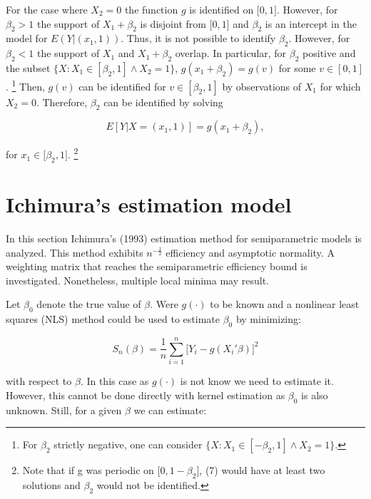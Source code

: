 \documentclass[a4paper]{article}
\begin{document}
For the case where $X_2 = 0$ the function $g$ is identified on $\big[0,1\big]$. However, for $\beta_2 > 1$ the support of $ X_1 + \beta_2$ is disjoint from $\big[0,1\big]$ and $\beta_2$ is an intercept in the model for $E(Y|(x_1,1))$. Thus, it is not possible to identify $\beta_2$. However, for $\beta_2 < 1$ the support of $X_1$ and $X_1 + \beta_2$ overlap. In particular, for $\beta_2$ positive and the subset $\{X: X_1 \in [\beta_2, 1] \wedge X_2 = 1\}$, $g(x_1 + \beta_2) = g(v)$ for some $v \in [0,1]$. \footnote{For $\beta_2$ strictly negative, one can consider $\{X: X_1 \in [ - \beta_2, 1] \wedge X_2 = 1\}$.} Then, $g(v)$ can be identified for $v \in [\beta_2, 1]$ by observations of $X_1$ for which $X_2 = 0$. Therefore, $\beta_2$ can be identified by solving

\begin{equation}
E[Y| X = (x_1,1)] = g(x_1 + \beta_2),
\end{equation}

for $x_1 \in \big[\beta_2, 1\big]$. \footnote{Note that if g was periodic on $\big[0, 1 - \beta_2 \big]$, (7) would have at least two solutions and $\beta_2$ would not be identified.}


\section{Ichimura's estimation model} %
\label{sec:Ichimura's estimation model}

In this section Ichimura's (1993) estimation method for semiparametric models is analyzed. This method exhibits $n^{-\frac{1}{2}}$ efficiency and asymptotic normality. A weighting matrix that reaches the semiparametric efficiency bound is investigated. Nonetheless, multiple local minima may result. 

Let $\beta_0$ denote the true value of $\beta$. Were $g(\cdot)$ to be known and a nonlinear least squares (NLS) method could be used to estimate $\beta_0$ by minimizing:

\begin{equation}
S_n(\beta) = \frac{1}{n}\sum_{i = 1}^n\big[Y_i - g(X_i'\beta)\big]^2
\end{equation}

with respect to $\beta$.
In this case as $g(\cdot)$ is not know we need to estimate it. However, this cannot be done directly with kernel estimation as $\beta_0$ is also unknown. Still, for a given $\beta$ we can estimate:
\end{document}
